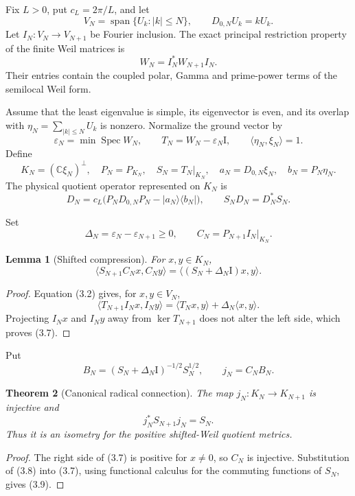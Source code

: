 \documentclass[11pt]{amsart}
\newtheorem{theorem}{Theorem}[section]
\newtheorem{lemma}[theorem]{Lemma}
\theoremstyle{definition}
\theoremstyle{remark}
\newcommand{\C}{\mathbb C}
\newcommand{\Spec}{\operatorname{Spec}}
\newcommand{\id}{\mathrm I}
\newcommand{\eps}{\varepsilon}
\begin{document}
Fix \(L>0\), put \(c_L=2\pi/L\), and let
\[
 V_N=\operatorname{span}\{U_k:|k|\le N\},
 \qquad D_{0,N}U_k=kU_k.
\tag{3.1}
\]
Let \(I_N:V_N\to V_{N+1}\) be Fourier inclusion.  The exact principal
restriction property of the finite Weil matrices is
\[
 W_N=I_N^*W_{N+1}I_N.
\tag{3.2}
\]
Their entries contain the coupled polar, Gamma and prime-power terms of the
semilocal Weil form.

Assume that the least eigenvalue is simple, its eigenvector is even, and its
overlap with
\(\eta_N=\sum_{|k|\le N}U_k\) is nonzero.  Normalize the ground vector by
\[
 \eps_N=\min\Spec W_N,
 \qquad T_N=W_N-\eps_N\id,
 \qquad \langle\eta_N,\xi_N\rangle=1.
\tag{3.3}
\]
Define
\[
 K_N=(\C\xi_N)^\perp,\quad P_N=P_{K_N},\quad
 S_N=T_N|_{K_N},\quad
 a_N=D_{0,N}\xi_N,\quad b_N=P_N\eta_N.
\tag{3.4}
\]
The physical quotient operator represented on \(K_N\) is
\[
 D_N=c_L\bigl(P_ND_{0,N}P_N-|a_N\rangle\langle b_N|\bigr),
 \qquad S_ND_N=D_N^*S_N.
\tag{3.5}
\]

Set
\[
 \Delta_N=\eps_N-\eps_{N+1}\ge0,
 \qquad C_N=P_{N+1}I_N|_{K_N}.
\tag{3.6}
\]

\begin{lemma}[Shifted compression]
For \(x,y\in K_N\),
\[
 \langle S_{N+1}C_Nx,C_Ny\rangle
 =\langle(S_N+\Delta_N\id)x,y\rangle.
\tag{3.7}
\]
\end{lemma}

\begin{proof}
Equation (3.2) gives, for \(x,y\in V_N\),
\[
 \langle T_{N+1}I_Nx,I_Ny\rangle
 =\langle T_Nx,y\rangle+\Delta_N\langle x,y\rangle.
\]
Projecting \(I_Nx\) and \(I_Ny\) away from \(\ker T_{N+1}\) does not alter
the left side, which proves (3.7).
\end{proof}

Put
\[
 B_N=(S_N+\Delta_N\id)^{-1/2}S_N^{1/2},
 \qquad j_N=C_NB_N.
\tag{3.8}
\]

\begin{theorem}[Canonical radical connection]
The map \(j_N:K_N\to K_{N+1}\) is injective and
\[
 j_N^*S_{N+1}j_N=S_N.
\tag{3.9}
\]
Thus it is an isometry for the positive shifted-Weil quotient metrics.
\end{theorem}

\begin{proof}
The right side of (3.7) is positive for \(x\ne0\), so \(C_N\) is
injective.  Substitution of (3.8) into (3.7), using functional calculus for
the commuting functions of \(S_N\), gives (3.9).
\end{proof}
\end{document}

